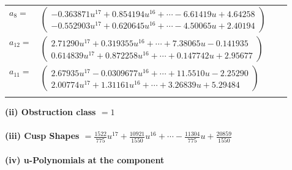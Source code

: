 \documentclass[1p]{elsarticle_modified}
\theoremstyle{definition}
\begin{document}
\begin{tabular}{m{7pt} m{180pt} m{7pt} m{180pt} }
\flushright $a_{8}=$&$\begin{pmatrix}-0.363871 u^{17}+0.854194 u^{16}+\cdots-6.61419 u+4.64258\\-0.552903 u^{17}+0.620645 u^{16}+\cdots-4.50065 u+2.40194\end{pmatrix}$ \\
\flushright $a_{12}=$&$\begin{pmatrix}2.71290 u^{17}+0.319355 u^{16}+\cdots+7.38065 u-0.141935\\0.614839 u^{17}+0.872258 u^{16}+\cdots+0.147742 u+2.95677\end{pmatrix}$ \\
\flushright $a_{11}=$&$\begin{pmatrix}2.67935 u^{17}-0.0309677 u^{16}+\cdots+11.5510 u-2.25290\\2.00774 u^{17}+1.31161 u^{16}+\cdots+3.26839 u+5.29484\end{pmatrix}$\\&\end{tabular}
\flushleft \textbf{(ii) Obstruction class $= 1$}\\~\\
\flushleft \textbf{(iii) Cusp Shapes $= \frac{1522}{775} u^{17}+\frac{10921}{1550} u^{16}+\cdots-\frac{11304}{775} u+\frac{20859}{1550}$}\\~\\
\newpage\renewcommand{\arraystretch}{1}
\flushleft \textbf{(iv) u-Polynomials at the component}\newline \\
\end{document}
